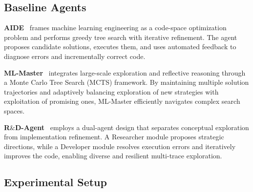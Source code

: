 \documentclass{midl} %
\begin{document}
\subsection{Baseline Agents}

\vspace{3pt} \noindent \textbf{AIDE}~\citep{schmidt2024aide} frames machine learning engineering as a code-space optimization problem and performs greedy tree search with iterative refinement. The agent proposes candidate solutions, executes them, and uses automated feedback to diagnose errors and incrementally correct code. 

\vspace{3pt} \noindent \textbf{ML-Master}~\citep{liu2025ml} integrates large-scale exploration and reflective reasoning through a Monte Carlo Tree Search (MCTS) framework. By maintaining multiple solution trajectories and adaptively balancing exploration of new strategies with exploitation of promising ones, ML-Master efficiently navigates complex search spaces. 

\vspace{3pt} \noindent \textbf{R$\&$D-Agent}~\citep{yang2025rdagentllmagentframeworkautonomous} employs a dual-agent design that separates conceptual exploration from implementation refinement. A Researcher module proposes strategic directions, while a Developer module resolves execution errors and iteratively improves the code, enabling diverse and resilient multi-trace exploration.

\subsection{Experimental Setup}
\end{document}
